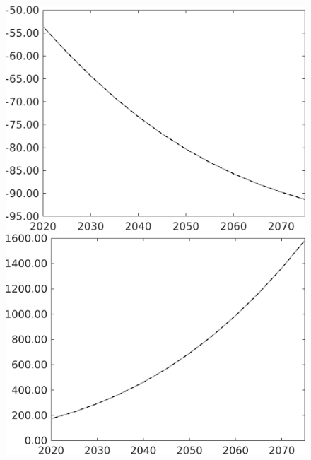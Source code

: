 \documentclass[12pt]{article}
\begin{document}
\begin{figure}[h!!]
\begin{minipage}[]{0.32\textwidth}
	\end{minipage}	
	\begin{minipage}[]{0.32\textwidth}
		\includegraphics[width=1\textwidth]{../../codding_model/own_basedOnFried/optimalPol_010922_revision/figures/all_13Sept22/PerdifNoTauf_Equlab_regime0_CompTaul_F_spillover0_nsk1_xgr0_knspil1_sep1_LFlimit0_emsbase0_countec0_GovRev0_etaa0.79_lgd0.png}
	\end{minipage}	
	\begin{minipage}[]{0.32\textwidth}
		\includegraphics[width=1\textwidth]{../../codding_model/own_basedOnFried/optimalPol_010922_revision/figures/all_13Sept22/PerdifNoTauf_Equlab_regime0_CompTaul_G_spillover0_nsk1_xgr0_knspil1_sep1_LFlimit0_emsbase0_countec0_GovRev0_etaa0.79_lgd0.png}

\end{minipage}
\end{figure}
\end{document}

